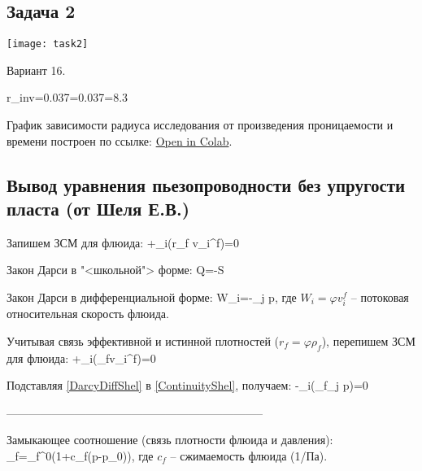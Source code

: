 \documentclass[main.tex]{subfiles}
\begin{document}
\subsection{Задача 2}

\texttt{[image: task2]}

Вариант 16.

\beq
r_{inv}=0.037=0.037=8.3
\eeq

График зависимости радиуса исследования от произведения проницаемости и времени построен по ссылке: \href{https://colab.research.google.com/github/mualal/notebooks-source/blob/master/7_exploration_radius.ipynb}{Open in Colab}.



\subsection{Вывод уравнения пьезопроводности без упругости пласта (от Шеля Е.В.)}

Запишем ЗСМ для флюида:
\beq
{}+\partial_i\left(r_f v_i^f\right)=0
\eeq

Закон Дарси в "<школьной"> форме:
\beq
Q=-S
\eeq

Закон Дарси в дифференциальной форме:
\beq\label{DarcyDiffShel}
W_i=-\partial_j p,
\eeq
где $W_i=\varphi v_i^f$ -- потоковая относительная скорость флюида.

Учитывая связь эффективной и истинной плотностей ($r_f=\varphi\rho_f$), перепишем ЗСМ для флюида:
\beq\label{ContinuityShel}
+\partial_i\left(\rho_f\varphi v_i^f\right)=0
\eeq

Подставляя \eqref{DarcyDiffShel} в \eqref{ContinuityShel}, получаем:
\beq\label{GeneralPiezo}
-\partial_i\left(\rho_f\partial_j p\right)=0
\eeq

--------------------------------------------------------------------

Замыкающее соотношение (связь плотности флюида и давления):
\beq\label{Zam1}
\rho_f=\rho_f^0\left(1+c_f\left(p-p_0\right)\right),
\eeq
где $c_f$ -- сжимаемость флюида (1/Па).
\end{document}
